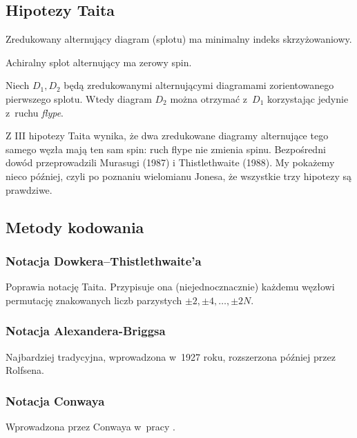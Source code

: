 {\subsection{Hipotezy Taita}
\begin{conjecture}
    \label{conj_tait_i}
    Zredukowany alternujący diagram (splotu) ma minimalny indeks skrzyżowaniowy.
\end{conjecture}

\begin{conjecture}
    \label{conj_tait_ii}
    Achiralny splot alternujący ma zerowy spin.
\end{conjecture}

\begin{conjecture}
    \label{conj_tait_iii}
    Niech $D_1, D_2$ będą zredukowanymi alternującymi diagramami zorientowanego pierwszego splotu.
    Wtedy diagram $D_2$ można otrzymać z~$D_1$ korzystając jedynie z~ruchu \emph{flype}.
\end{conjecture}

Z III hipotezy Taita wynika, że dwa zredukowane diagramy alternujące tego samego węzła mają ten sam spin: ruch flype nie zmienia spinu.
Bezpośredni dowód przeprowadzili Murasugi (1987) i Thistlethwaite (1988).
My pokażemy nieco później, czyli po poznaniu wielomianu Jonesa, że wszystkie trzy hipotezy są prawdziwe.

\subsection{Metody kodowania}
\subsubsection{Notacja Dowkera--Thistlethwaite'a}
Poprawia notację Taita.
Przypisuje ona (niejednocznacznie) każdemu węzłowi permutację znakowanych liczb parzystych $\pm 2, \pm 4, \ldots, \pm 2N$.

\subsubsection{Notacja Alexandera-Briggsa}
Najbardziej tradycyjna, wprowadzona w~1927 roku, rozszerzona później przez Rolfsena.

\subsubsection{Notacja Conwaya}
Wprowadzona przez Conwaya w~pracy \cite{conway70}.

}
